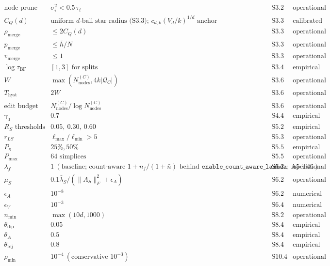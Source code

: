 \documentclass[11pt]{article}
\begin{document}
\[\begin{array}{llll}
\text{node prune variance} & \sigma_i^2<0.5\,\tau_i & \text{S3.2} & \text{operational}\\
C_Q(d) & \text{uniform }d\text{-ball star radius (S3.3); }c_{d,k}(V_d/k)^{1/d}\text{ anchor} & \text{S3.3} & \text{calibrated}\\
\rho_{\mathrm{merge}} & \le 2C_Q(d) & \text{S3.3} & \text{operational}\\
p_{\mathrm{merge}} & \le \bar h/N & \text{S3.3} & \text{operational}\\
v_{\mathrm{merge}} & \le 1 & \text{S3.3} & \text{operational}\\
\log\tau_{\mathrm{BF}} & [1,3]\text{ for splits} & \text{S3.4} & \text{empirical}\\
W & \max(N_{\mathrm{nodes}}^{(C)},4k|\mathcal Q_C|) & \text{S3.6} & \text{operational}\\
T_{\mathrm{hyst}} & 2W & \text{S3.6} & \text{operational}\\
\text{edit budget} & N_{\mathrm{nodes}}^{(C)}/\log N_{\mathrm{nodes}}^{(C)} & \text{S3.6} & \text{operational}\\
\gamma_0 & 0.7 & \text{S4.4} & \text{empirical}\\
R_S\text{ thresholds} & 0.05,\ 0.30,\ 0.60 & \text{S5.2} & \text{empirical}\\
r_{LS} & \ell_{\max}/\ell_{\min}>5 & \text{S5.3} & \text{operational}\\
P_\kappa & 25\%,50\% & \text{S5.5} & \text{empirical}\\
P_{\max} & 64\text{ simplices} & \text{S5.5} & \text{operational}\\
\lambda_f & 1\ (\text{baseline; count-aware }1+n_f/(1+\bar n)\text{ behind }\texttt{enable\_count\_aware\_lambda}\text{; A5-T46}) & \text{S6.2} & \text{operational}\\
\mu_S & 0.1\bar\lambda_S/(\|A_S\|_F^2+\epsilon_A) & \text{S6.2} & \text{operational}\\
\epsilon_A & 10^{-8} & \text{S6.2} & \text{numerical}\\
\epsilon_V & 10^{-3} & \text{S6.4} & \text{numerical}\\
n_{\min} & \max(10d,1000) & \text{S8.2} & \text{operational}\\
\theta_{\mathrm{dip}} & 0.05 & \text{S8.4} & \text{empirical}\\
\theta_A & 0.5 & \text{S8.4} & \text{empirical}\\
\theta_{\mathrm{rej}} & 0.8 & \text{S8.4} & \text{empirical}\\
\rho_{\min} & 10^{-4}\ (\text{conservative }10^{-3}) & \text{S10.4} & \text{operational}\\

\end{array}\]
\end{document}
